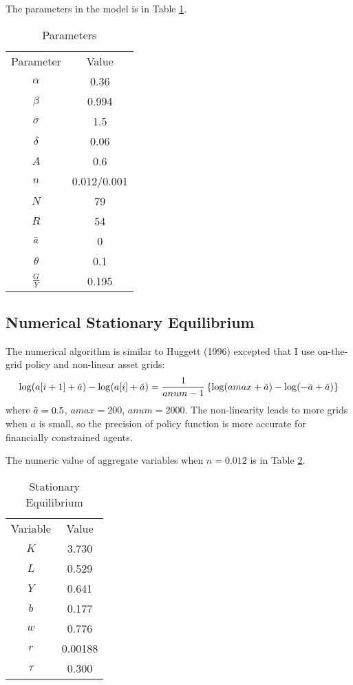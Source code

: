 \documentclass{article}
\begin{document}
	The parameters in the model is in Table \ref{tab:params}.
	
	\begin{table}[h]
		\centering
		\begin{tabular}{c|c}
			Parameter & Value \\
			$\alpha$ & 0.36\\
			$\beta$ & 0.994\\
			$\sigma$ & 1.5\\
			$\delta$ & 0.06\\
			$A$ & 0.6\\
			$n$ & 0.012/0.001\\
			$N$ & 79\\
			$R$ & 54\\
			$\Bar{a}$ & 0\\
			$\theta$ & 0.1\\
			$\frac{G}{Y}$ & 0.195\\
		\end{tabular}
		\caption{Parameters}
		\label{tab:params}
	\end{table}
	
	\subsection{Numerical Stationary Equilibrium}
	The numerical algorithm is similar to Huggett (1996) excepted that I use on-the-grid policy and non-linear asset grids:
	\begin{equation}
		\log (a[i+1]+\Tilde{a}) - \log(a[i]+\Tilde{a}) = \frac{1}{anum-1}\left\{\log (amax+\Tilde{a}) - \log(-\Bar{a}+\Tilde{a})\right\}
	\end{equation}
	where $\Tilde{a}=0.5$, $amax=200$, $anum=2000$.
	The non-linearity leads to more grids when $a$ is small, so the precision of policy function is more accurate for financially constrained agents.
	
	The numeric value of aggregate variables when $n=0.012$ is in Table \ref{tab:se}.
	
	\begin{table}[h]
		\centering
		\begin{tabular}{c|c}
			Variable & Value \\
			$K$ & 3.730\\
			$L$ & 0.529\\
			$Y$ & 0.641\\
			$b$ & 0.177\\
			$w$ & 0.776\\
			$r$ & 0.00188\\
			$\tau$ & 0.300\\
		\end{tabular}
		\caption{Stationary Equilibrium}
		\label{tab:se}
	\end{table}
	
\end{document}
